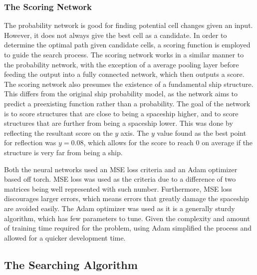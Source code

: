 \documentclass{l4proj}
\begin{document}
\subsubsection{The Scoring Network}

The probability network is good for finding potential cell changes given an input. However, it does not always give the best cell as a candidate. In order to determine the optimal path given candidate cells, a scoring function is employed to guide the search process. The scoring network works in a similar manner to the probability network, with the exception of a average pooling layer before feeding the output into a fully connected network, which then outputs a score. The scoring network also presumes the existence of a fundamental ship structure. This differs from the original ship probability model, as the network aims to predict a preexisting function rather than a probability. The goal of the network is to score structures that are close to being a spaceship higher, and to score structures that are further from being a spaceship lower. This was done by reflecting the resultant score on the $y$ axis. The $y$ value found as the best point for reflection was $y=0.08$, which allows for the score to reach 0 on average if the structure is very far from being a ship.

Both the neural networks used an MSE loss criteria and an Adam optimizer based off torch. MSE loss was used as the criteria due to a difference of two matrices being well represented with such number. Furthermore, MSE loss discourages larger errors, which means errors that greatly damage the spaceship are avoided easily. The Adam optimizer was used as it is a generally sturdy algorithm, which has few parameters to tune. Given the complexity and amount of training time required for the problem, using Adam simplified the process and allowed for a quicker development time.

\subsection{The Searching Algorithm}
\end{document}
